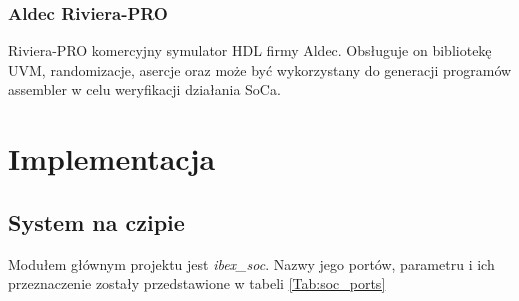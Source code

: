 \documentclass[11pt,a4paper]{article}
\begin{document}
			\subsubsection{Aldec Riviera-PRO}
			\hspace{5mm}
				Riviera-PRO komercyjny symulator HDL firmy Aldec. Obsługuje on bibliotekę UVM, randomizacje, asercje oraz może być wykorzystany do generacji programów assembler w celu weryfikacji działania SoCa.
				
\newpage

\section{Implementacja}

	\subsection{System na czipie}
	\hspace{5mm}
	Modułem głównym projektu jest \textit{ibex\_soc}. Nazwy jego portów, parametru i ich przeznaczenie zostały przedstawione w tabeli \ref{Tab:soc_ports}
\end{document}
